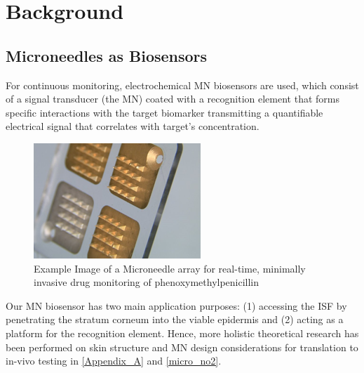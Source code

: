 \section{Background}
\vspace{-0.5cm}
\subsection{Microneedles as Biosensors}
\vspace{-0.5cm}
For continuous monitoring, electrochemical MN biosensors are used, which consist of a signal transducer (the MN) coated with a recognition element that forms specific interactions with the target biomarker transmitting a quantifiable electrical signal that correlates with target’s concentration.
\begin{center}
    \begin{figure}[H]
    \centering
    \includegraphics[width=.4\textwidth]{img/microneedle_patch.png}
    \caption{Example Image of a Microneedle array for real-time, minimally invasive drug monitoring of phenoxymethylpenicillin \cite{rawson2019microneedle}}
    \label{fig:microneedle}
\end{figure}
\end{center}
\vspace{-1cm}
Our MN biosensor has two main application purposes: (1) accessing the ISF by penetrating the stratum corneum into the viable epidermis and (2) acting as a platform for the recognition element. Hence, more holistic theoretical research has been performed on skin structure and MN design considerations for translation to in-vivo testing in \autoref{Appendix_A} and \autoref{micro_no2}.
